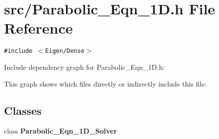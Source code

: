 \section{src/Parabolic\_\-Eqn\_\-1D.h File Reference}
\label{Parabolic__Eqn__1D_8h}
{\tt \#include $<$Eigen/Dense$>$}\par


Include dependency graph for Parabolic\_\-Eqn\_\-1D.h:

This graph shows which files directly or indirectly include this file:\subsection*{Classes}
\begin{CompactItemize}
\item 
class \bf{Parabolic\_\-Eqn\_\-1D\_\-Solver}
\end{CompactItemize}

